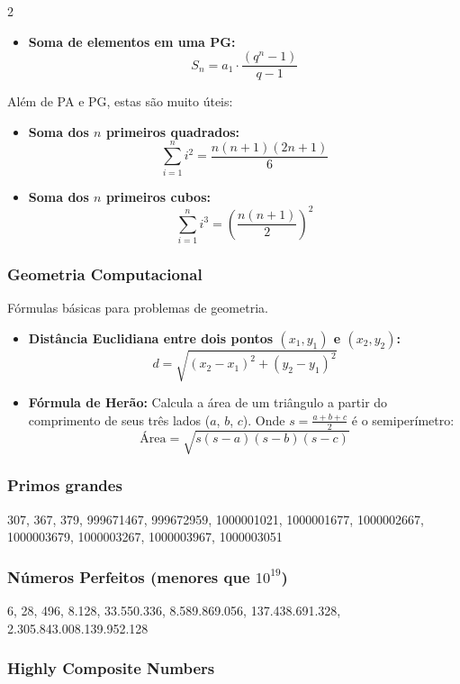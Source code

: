 \documentclass[11pt]{article}
\begin{document}
\begin{multicols}{2}
\begin{itemize}
    \item \textbf{Soma de elementos em uma PG:}
    \[ S_n = a_1 \cdot \frac{(q^n - 1)}{q - 1} \]
\end{itemize}

Além de PA e PG, estas são muito úteis:
\begin{itemize}
    \item \textbf{Soma dos $n$ primeiros quadrados:}
    \[ \sum_{i=1}^{n} i^2 = \frac{n(n+1)(2n+1)}{6} \]
    
    \item \textbf{Soma dos $n$ primeiros cubos:}
    \[ \sum_{i=1}^{n} i^3 = \left(\frac{n(n+1)}{2}\right)^2 \]
\end{itemize}

\subsubsection{Geometria Computacional}

Fórmulas básicas para problemas de geometria.

\begin{itemize}
    \item \textbf{Distância Euclidiana entre dois pontos $(x_1, y_1)$ e $(x_2, y_2)$:}
    \[ d = \sqrt{(x_2-x_1)^2 + (y_2-y_1)^2} \]
    
    \item \textbf{Fórmula de Herão:} Calcula a área de um triângulo a partir do comprimento de seus três lados ($a$, $b$, $c$). Onde $s = \frac{a+b+c}{2}$ é o semiperímetro:
    \[ \text{Área} = \sqrt{s(s-a)(s-b)(s-c)} \]
\end{itemize}

\subsubsection{Primos grandes}
307, 367, 379, 999671467, 999672959, 1000001021, 1000001677, 1000002667, 1000003679, 1000003267, 1000003967, 1000003051

\subsubsection{Números Perfeitos (menores que $10^{19}$)}
6, 28, 496, 8.128, 33.550.336, 8.589.869.056, 137.438.691.328, 2.305.843.008.139.952.128

\subsubsection{Highly Composite Numbers}


\end{multicols}
\end{document}
